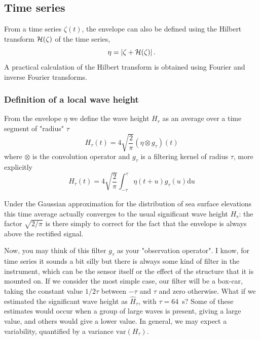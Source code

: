 {\subsection{Time series}
From a time series $\zeta(t)$, the envelope can also be defined using the  Hilbert transform $\cal{H}(\zeta)$ of the time series, 
\begin{equation}
   \eta  = \left| \zeta + \cal{H}(\zeta) \right|.
   \label{eq:env_Hilbert}
\end{equation}
A practical calculation of the Hilbert transform is obtained using Fourier and inverse Fourier transforms. 


\subsubsection{Definition of a local wave height}
From the envelope $\eta$ we define the wave height $H_{r}$ as an average over a time segment of "radius" $\tau$
\begin{equation}
    H_{\tau}(t) = 4\sqrt{\frac{2}{\pi}} (\eta \otimes g_{\tau})(t)
   \label{eq:relation_Hs_eta}
\end{equation}
where $\otimes$ is the convolution operator and $g_{\tau}$ is a filtering kernel of radius $\tau$, more explicitly 
\begin{equation}
    H_{\tau}(t) = 4\sqrt{\frac{2}{\pi}} \int_{-\tau}^\tau \eta(t+u)   g_{\tau}(u) {\mathrm d}u
   \label{eq:relation_Hs_eta}
\end{equation}

Under the Gaussian approximation for the distribution of sea surface elevations this time average actually converges to the usual significant wave height $H_s$: the factor $\sqrt{{2}/{\pi}}$ is there simply to correct for the fact that the envelope is always above the rectified signal. 

Now, you may think of this filter $g_\tau$ as your "observation operator". I know, for time series it sounds a bit silly but there is always some kind of filter in the instrument, which can be the sensor itself or the effect of the structure that it is mounted on. If we consider the most simple case, our filter will be a box-car, taking the constant value $1/2\tau$ between $-\tau$ and $\tau$ and zero otherwise. What if we estimated the significant wave height as  $\widehat{H}_\tau$, with $\tau=64$~s? Some of these estimates would occur when a group of large waves is present, giving a large value, and others would give a lower value. In general, we may expect a variability, quantified by a variance $   \mathrm{var}(H_\tau)$. 

}
